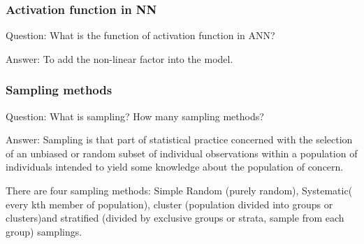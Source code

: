 \documentclass[11pt]{beamer}
\begin{document}
\begin{frame}
\frametitle{Activation function in NN}
\begin{block}{Question:}
	What is the function of activation function in ANN?
\end{block}
\begin{block}{Answer:}
	To add the non-linear factor into the model.
\end{block}
\end{frame}

\begin{frame}
\frametitle{Sampling methods}
\begin{block}{Question:}
	What is sampling? How many sampling methods?
\end{block}
\begin{block}{Answer:}
	Sampling is that part of statistical practice concerned with the selection of an unbiased or random subset of individual observations within a population of individuals intended to yield some knowledge about the population of concern.
	
	There are four sampling methods: Simple Random (purely random), Systematic( every kth member of population), cluster (population divided into groups or clusters)and stratified (divided by exclusive groups or strata, sample from each group) samplings.
\end{block}
\end{frame}
\end{document}
